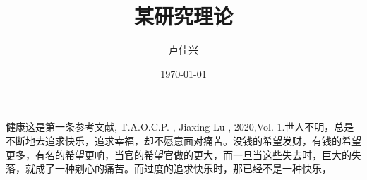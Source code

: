 \documentclass[a4paper,12pt]{report}
\begin{document}
    
\title{某研究理论}  %
\author{卢佳兴}  %
\date{\today}    %
\maketitle  %



    \begin{thebibliography}{123456}
        \bibitem 健康这是第一条参考文献, T.A.O.C.P. , Jiaxing Lu , 2020,Vol. 1.世人不明，总是不断地去追求快乐，追求幸福，却不愿意面对痛苦。没钱的希望发财，有钱的希望更多，有名的希望更响，当官的希望官做的更大，而一旦当这些失去时，巨大的失落，就成了一种剜心的痛苦。而过度的追求快乐时，那已经不是一种快乐，
   
    \end{thebibliography}
\tableofcontents






\end{document}
